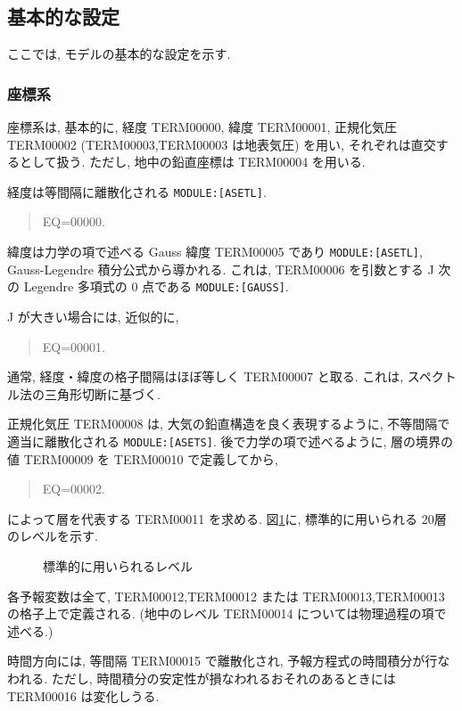 ﻿
\subsection{基本的な設定}

ここでは, モデルの基本的な設定を示す.

\subsubsection{座標系}

座標系は, 基本的に,
経度 TERM00000, 緯度 TERM00001, 正規化気圧 TERM00002 
(TERM00003,TERM00003 は地表気圧)
を用い, それぞれは直交するとして扱う.
ただし, 地中の鉛直座標は TERM00004 を用いる.

経度は等間隔に離散化される \texttt{MODULE:[ASETL]}.
\begin{quote}
EQ=00000.
\end{quote}

緯度は力学の項で述べる Gauss 緯度 TERM00005 であり \texttt{MODULE:[ASETL]},
Gauss-Legendre 積分公式から導かれる.
これは, TERM00006 を引数とする
J 次の Legendre 多項式の 0 点である \texttt{MODULE:[GAUSS]}. 

J が大きい場合には, 近似的に,
\begin{quote}
EQ=00001.
\end{quote}

通常, 経度・緯度の格子間隔はほぼ等しく TERM00007 と取る. 
これは, スペクトル法の三角形切断に基づく.

正規化気圧 TERM00008 は, 大気の鉛直構造を良く表現するように,
不等間隔で適当に離散化される \texttt{MODULE:[ASETS]}.
後で力学の項で述べるように, 層の境界の値
TERM00009 を TERM00010 で定義してから,
%
\begin{quote}
EQ=00002.
\end{quote}
によって層を代表する TERM00011 を求める.
図\ref{a-setup:level}に, 標準的に用いられる 20層のレベルを示す.

\begin{figure}[hbtp]
  \begin{center}
  \end{center}
  \caption{標準的に用いられるレベル}
  \label{a-setup:level}
\end{figure}

各予報変数は全て, TERM00012,TERM00012
または TERM00013,TERM00013 の格子上で定義される.
(地中のレベル TERM00014 については物理過程の項で述べる.)

時間方向には, 等間隔 TERM00015 で離散化され,
予報方程式の時間積分が行なわれる.
ただし, 時間積分の安定性が損なわれるおそれのあるときには
TERM00016 は変化しうる.

